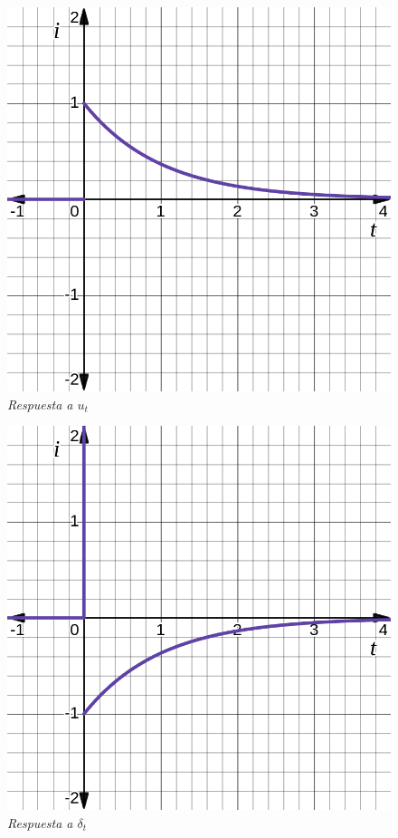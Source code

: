 \documentclass[12pt,a4paper]{report}
\begin{document}
\begin{enumerate}[label=\alph*)]
      \noindent
      \begin{figure}[h]
        \centering
        \begin{minipage}[h]{0.4\textwidth}
          \centering
          \includegraphics[width=1\textwidth]{./images/ej4.2.png}
          \textit{Respuesta a $u_t$}
        \end{minipage}
        \hspace{5mm}
        \begin{minipage}[h]{0.4\textwidth}
          \centering
          \includegraphics[width=1\textwidth]{./images/ej4.3.png}
          \textit{Respuesta a $\delta_t$}
        \end{minipage}
      \end{figure}


\end{enumerate}
\end{document}
